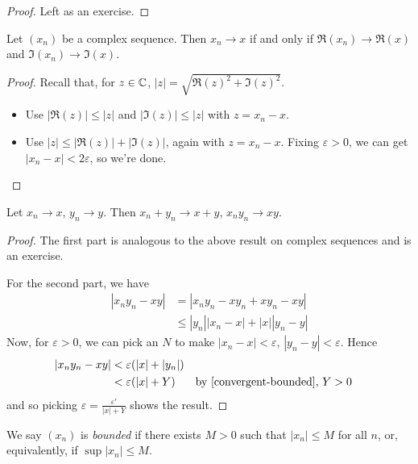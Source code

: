 \documentclass{../../template/note}
\begin{document}
    \begin{proof}
        Left as an exercise.
    \end{proof}
    
    \begin{lemma}
        Let \((x_n)\) be a complex sequence. Then \(x_n \to x\) if and only if \(\Re(x_n) \to \Re(x)\) and \(\Im(x_n) \to \Im(x)\).
    \end{lemma}
    
    \begin{proof}
        Recall that, for \(z \in \mathbb C\), \(|z| = \sqrt{\Re(z)^2 + \Im(z)^2}\).
        \begin{itemize}
            \item[\(\implies\)] Use \(|\Re(z)| \leq |z|\) and \(|\Im(z)| \leq |z|\) with \(z = x_n - x\).
            \item[\(\impliedby\)] Use \(|z| \leq |\Re(z)| + |\Im(z)|\), again with \(z = x_n - x\). Fixing \(\varepsilon > 0\), we can get \(|x_n - x| < 2\varepsilon\), so we're done.
        \end{itemize}
    \end{proof}
    
    \begin{lemma}
        Let \(x_n \to x\), \(y_n \to y\). Then \(x_n + y_n \to x + y\), \(x_ny_n \to xy\).
    \end{lemma}
    
    \begin{proof}
        The first part is analogous to the above result on complex sequences and is an exercise.

        For the second part, we have
        \begin{align*}
            |x_ny_n - xy| &= |x_ny_n - xy_n + xy_n - xy| \\
            &\leq |y_n||x_n-x| + |x||y_n-y|
        \end{align*}
        Now, for \(\varepsilon > 0\), we can pick an \(N\) to make \(|x_n - x| < \varepsilon\), \(|y_n - y| < \varepsilon\). Hence
        \begin{align*}
            |x_ny_n - xy| &< \varepsilon(|x| + |y_n|) \\
            &< \varepsilon(|x| + Y) && \text{by \cref{convergent-bounded}, } Y>0
        \end{align*}
        and so picking \(\varepsilon = \frac{\varepsilon'}{|x| + Y}\) shows the result.
    \end{proof}
    
    \begin{definition}
        We say \((x_n)\) is \emph{bounded} if there exists \(M > 0\) such that \(|x_n| \leq M\) for all \(n\), or, equivalently, if \(\sup |x_n| \leq M\).
    \end{definition}
    
\end{document}
